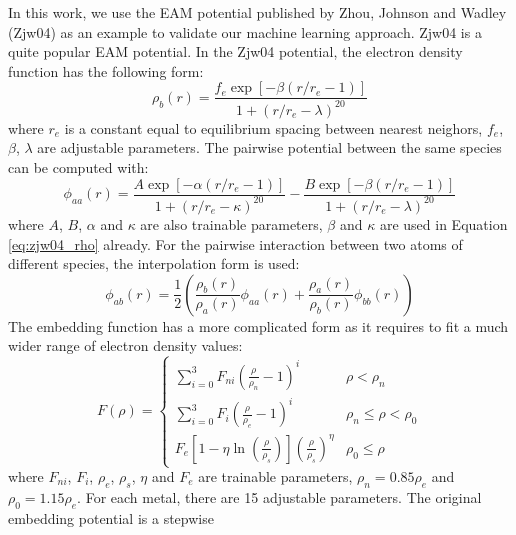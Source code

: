 \documentclass[prb,reprint,superscriptaddress]{revtex4-2}
\begin{document}
In this work, we use the EAM potential published by Zhou, Johnson and Wadley 
(Zjw04) \cite{ZJW0,ZJW1,ZJW2} as an example to validate our machine learning 
approach. Zjw04 is a quite popular EAM potential. In the Zjw04 potential, the 
electron density function has the following form:
\begin{equation}
\label{eq:zjw04_rho}
\rho_{b}(r) = \frac{
    f_{e} \exp\left[ -\beta\left( r/r_{e} - 1 \right) \right]
}{
    1 + \left(r/r_{e} - \lambda\right)^{20}
}
\end{equation}
where $r_e$ is a constant equal to equilibrium spacing between nearest neighors, 
$f_{e}$, $\beta$, $\lambda$ are adjustable parameters. The pairwise potential 
between the same species can be computed with:
\begin{equation}
\label{eq:zjw04_phi_aa}
\phi_{aa}(r) = 
\frac{A \exp\left[ -\alpha\left( r/r_{e} - 1 \right) \right]}
     {1 + \left(r / r_{e} - \kappa\right)^{20}} - 
\frac{B \exp\left[ -\beta\left( r/r_{e} - 1 \right) \right]}
     {1 + \left(r / r_{e} - \lambda\right)^{20}}
\end{equation}
where $A$, $B$, $\alpha$ and $\kappa$ are also trainable parameters, $\beta$ and 
$\kappa$ are used in Equation \ref{eq:zjw04_rho} already. For the pairwise 
interaction between two atoms of different species, the interpolation form is 
used:
\begin{equation}
\label{eq:zjw04_phi_ab}
\phi_{ab}(r) = \frac{1}{2}\left(
    \frac{\rho_{b}(r)}{\rho_{a}(r)}\phi_{aa}(r) +
    \frac{\rho_{a}(r)}{\rho_{b}(r)}\phi_{bb}(r) 
\right)
\end{equation}
The embedding function has a more complicated form as it requires to fit a much 
wider range of electron density values:
\begin{equation}
\label{eq:zjw04_embed}
F(\rho) = \begin{cases}
    \sum_{i=0}^{3}{F_{ni}\left( \frac{\rho}{\rho_n} - 1 \right)^{i}} &
    \rho < \rho_{n} \\
    \sum_{i=0}^{3}{F_{i}\left( \frac{\rho}{\rho_e} - 1 \right)^{i}} &
    \rho_{n} \leq \rho < \rho_{0} \\
    F_{e}\left[ 
        1 - \eta\ln\left( \frac{\rho}{\rho_s}\right) 
    \right](\frac{\rho}{\rho_s})^{\eta} & \rho_{0} \leq \rho
\end{cases}
\end{equation}
where $F_{ni}$, $F_{i}$, $\rho_e$, $\rho_s$, $\eta$ and $F_{e}$ are trainable 
parameters, $\rho_n=0.85\rho_e$ and $\rho_0=1.15\rho_e$. For each metal, there 
are 15 adjustable parameters. The original embedding potential is a stepwise 
\end{document}
